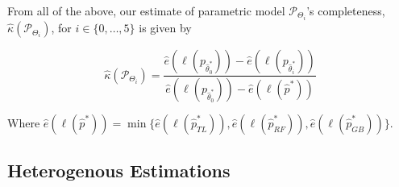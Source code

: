\documentclass[11pt,a4paper]{article}
\theoremstyle{definition}
\begin{document}
From all of the above, our estimate of parametric model \(\mathcal{P}_{\Theta_i}\)'s completeness, \(\hat{\kappa}(\mathcal{P}_{\Theta_i})\),  for \(i\in\{0,\dots, 5\}\) is given by

\begin{equation}
\label{eq:completeness_estim}
\hat{\kappa}(\mathcal{P}_{\Theta_i})=\frac{\hat{e}(\ell(p_{\hat{\theta}^*_0}))-\hat{e}(\ell(p_{\hat{\theta}^*_i}))}{\hat{e}(\ell(p_{\hat{\theta}^*_0}))-\hat{e}(\ell(\hat{p}^*))}
\end{equation}

Where \(\hat{e}(\ell(\hat{p}^*))=\min\{\hat{e}(\ell(\hat{p}^*_{TL})),\hat{e}(\ell(\hat{p}^*_{RF})),\hat{e}(\ell(\hat{p}^*_{GB}))\}\).

\subsection{Heterogenous Estimations}
\label{sec:heterogenous_estimations}
\end{document}
